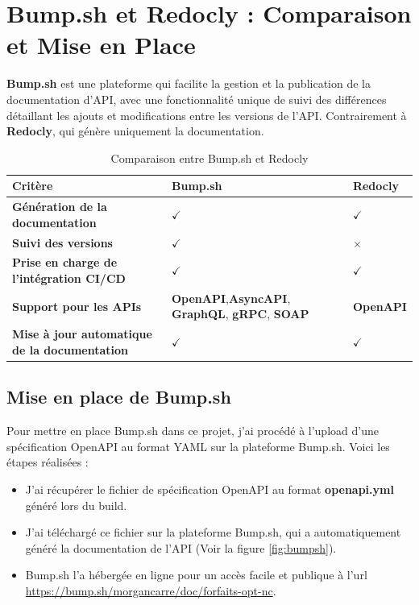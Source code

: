 \documentclass[11pt]{article}
\begin{document}
		\section{Bump.sh et Redocly : Comparaison et Mise en Place}
		
		\textbf{Bump.sh} est une plateforme qui facilite la gestion et la publication de la documentation d'API, avec une fonctionnalité unique de suivi des différences détaillant les ajouts et modifications entre les versions de l'API. Contrairement à \textbf{Redocly}, qui génère uniquement la documentation.
		\begin{table}[h!]
			\centering
			\begin{tabularx}{\textwidth}{|X|X|X|}
				\hline
				\textbf{Critère} & \textbf{Bump.sh} & \textbf{Redocly} \\
				\hline
				\textbf{Génération de la documentation} & $\checkmark$ & $\checkmark$ \\
				\hline
				\textbf{Suivi des versions} & $\checkmark$ & $\times$ \\
				\hline
				\textbf{Prise en charge de l'intégration CI/CD} & $\checkmark$ & $\checkmark$ \\
				\hline
				\textbf{Support pour les APIs} &  \textbf{OpenAPI},\textbf{AsyncAPI}, \textbf{GraphQL}, \textbf{gRPC}, \textbf{SOAP} & \textbf{OpenAPI} \\
				\hline
				\textbf{Mise à jour automatique de la documentation} & $\checkmark$ & $\checkmark$ \\
				\hline
			\end{tabularx}
			\caption{Comparaison entre Bump.sh et Redocly}
		\end{table}
		\subsection*{Mise en place de Bump.sh}
		
		Pour mettre en place Bump.sh dans ce projet, j'ai procédé à l'upload d'une spécification OpenAPI au format YAML sur la plateforme Bump.sh. Voici les étapes réalisées :
		
		\begin{itemize}
			\item J'ai récupérer le fichier de spécification OpenAPI au format \textbf{openapi.yml} généré lors du build.
			\item J'ai téléchargé ce fichier sur la plateforme Bump.sh, qui a automatiquement généré la documentation de l'API (Voir la figure \ref{fig:bumpsh}).
			\item Bump.sh l'a hébergée en ligne pour un accès facile et publique à l'url \url{https://bump.sh/morgancarre/doc/forfaits-opt-nc}.
		\end{itemize}
			
\end{document}
